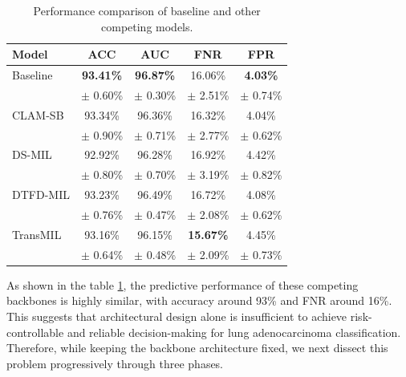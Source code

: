 \documentclass[journal]{IEEEtran}
\theoremstyle{remark}
\begin{document}
\begin{table}[htbp]
    \centering
    \caption{Performance comparison of baseline and other competing models.}\label{tab:sota_comparison}
    \begin{tabular}{lcccc}
        \toprule
        Model & ACC & AUC & FNR & FPR \\
        \midrule
        Baseline & \textbf{93.41\%} & \textbf{96.87\%} & 16.06\% & \textbf{4.03\%} \\
                 & $\pm$ 0.60\% & $\pm$ 0.30\% & $\pm$ 2.51\% & $\pm$ 0.74\% \\
        \midrule
        CLAM-SB  & 93.34\% & 96.36\% & 16.32\% & 4.04\% \\
                 & $\pm$ 0.90\% & $\pm$ 0.71\% & $\pm$ 2.77\% & $\pm$ 0.62\% \\
        \midrule
        DS-MIL   & 92.92\% & 96.28\% & 16.92\% & 4.42\% \\
                 & $\pm$ 0.80\% & $\pm$ 0.70\% & $\pm$ 3.19\% & $\pm$ 0.82\% \\
        \midrule
        DTFD-MIL & 93.23\% & 96.49\% & 16.72\% & 4.08\% \\
                 & $\pm$ 0.76\% & $\pm$ 0.47\% & $\pm$ 2.08\% & $\pm$ 0.62\% \\
        \midrule
        TransMIL & 93.16\% & 96.15\% & \textbf{15.67\%} & 4.45\% \\
                 & $\pm$ 0.64\% & $\pm$ 0.48\% & $\pm$ 2.09\% & $\pm$ 0.73\% \\
        \bottomrule
    \end{tabular}
\end{table}

As shown in the table \ref{tab:sota_comparison}, the predictive performance of these competing backbones is highly similar, with accuracy around 93\% and FNR around 16\%. This suggests that architectural design alone is insufficient to achieve risk-controllable and reliable decision-making for lung adenocarcinoma classification. Therefore, while keeping the backbone architecture fixed, we next dissect this problem progressively through three phases.

\end{document}
